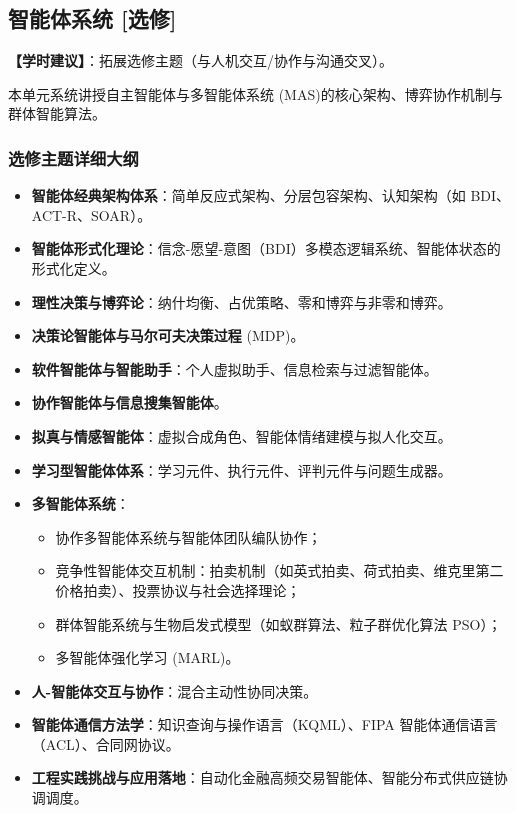 \subsection{智能体系统 [选修]}
\textbf{【学时建议】}：拓展选修主题（与人机交互/协作与沟通交叉）。

本单元系统讲授自主智能体与多智能体系统 (MAS)的核心架构、博弈协作机制与群体智能算法。

\subsubsection{选修主题详细大纲}
\begin{itemize}
    \item \textbf{智能体经典架构体系}：简单反应式架构、分层包容架构、认知架构（如 BDI、ACT-R、SOAR）。
    \item \textbf{智能体形式化理论}：信念-愿望-意图（BDI）多模态逻辑系统、智能体状态的形式化定义。
    \item \textbf{理性决策与博弈论}：纳什均衡、占优策略、零和博弈与非零和博弈。
    \item \textbf{决策论智能体与马尔可夫决策过程} (MDP)。
    \item \textbf{软件智能体与智能助手}：个人虚拟助手、信息检索与过滤智能体。
    \item \textbf{协作智能体与信息搜集智能体}。
    \item \textbf{拟真与情感智能体}：虚拟合成角色、智能体情绪建模与拟人化交互。
    \item \textbf{学习型智能体体系}：学习元件、执行元件、评判元件与问题生成器。
    \item \textbf{多智能体系统}：
    \begin{itemize}
        \item 协作多智能体系统与智能体团队编队协作；
        \item 竞争性智能体交互机制：拍卖机制（如英式拍卖、荷式拍卖、维克里第二价格拍卖）、投票协议与社会选择理论；
        \item 群体智能系统与生物启发式模型（如蚁群算法、粒子群优化算法 PSO）；
        \item 多智能体强化学习 (MARL)。
    \end{itemize}
    \item \textbf{人-智能体交互与协作}：混合主动性协同决策。
    \item \textbf{智能体通信方法学}：知识查询与操作语言（KQML）、FIPA 智能体通信语言（ACL）、合同网协议。
    \item \textbf{工程实践挑战与应用落地}：自动化金融高频交易智能体、智能分布式供应链协调调度。
\end{itemize}

